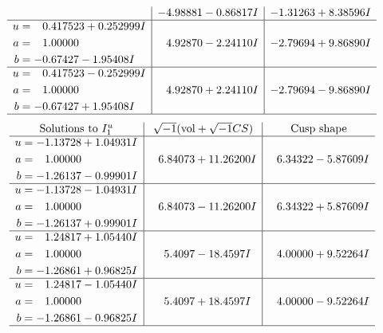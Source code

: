 \documentclass[1p]{elsarticle_modified}
\theoremstyle{definition}
\newcommand{\I}{\sqrt{-1}}
\begin{document}
$$\begin{array}{c|c|c}
 & -4.98881 - 0.86817 I & -1.31263 + 8.38596 I \\ \hline\begin{aligned}
u &= \phantom{-}0.417523 + 0.252999 I \\
a &= \phantom{-}1.00000\phantom{ +0.000000I} \\
b &= -0.67427 - 1.95408 I\end{aligned}
 & \phantom{-}4.92870 - 2.24110 I & -2.79694 + 9.86890 I \\ \hline\begin{aligned}
u &= \phantom{-}0.417523 - 0.252999 I \\
a &= \phantom{-}1.00000\phantom{ +0.000000I} \\
b &= -0.67427 + 1.95408 I\end{aligned}
 & \phantom{-}4.92870 + 2.24110 I & -2.79694 - 9.86890 I\\
 \hline 
 \end{array}$$\newpage$$\begin{array}{c|c|c}  
\text{Solutions to }I^u_{1}& \I (\text{vol} + \sqrt{-1}CS) & \text{Cusp shape}\\
 \hline 
\begin{aligned}
u &= -1.13728 + 1.04931 I \\
a &= \phantom{-}1.00000\phantom{ +0.000000I} \\
b &= -1.26137 - 0.99901 I\end{aligned}
 & \phantom{-}6.84073 + 11.26200 I & \phantom{-}6.34322 - 5.87609 I \\ \hline\begin{aligned}
u &= -1.13728 - 1.04931 I \\
a &= \phantom{-}1.00000\phantom{ +0.000000I} \\
b &= -1.26137 + 0.99901 I\end{aligned}
 & \phantom{-}6.84073 - 11.26200 I & \phantom{-}6.34322 + 5.87609 I \\ \hline\begin{aligned}
u &= \phantom{-}1.24817 + 1.05440 I \\
a &= \phantom{-}1.00000\phantom{ +0.000000I} \\
b &= -1.26861 + 0.96825 I\end{aligned}
 & \phantom{-}5.4097 - 18.4597 I & \phantom{-}4.00000 + 9.52264 I \\ \hline\begin{aligned}
u &= \phantom{-}1.24817 - 1.05440 I \\
a &= \phantom{-}1.00000\phantom{ +0.000000I} \\
b &= -1.26861 - 0.96825 I\end{aligned}
 & \phantom{-}5.4097 + 18.4597 I & \phantom{-}4.00000 - 9.52264 I\\
 \hline 
 \end{array}$$\newpage\newpage\renewcommand{\arraystretch}{1}
\end{document}
